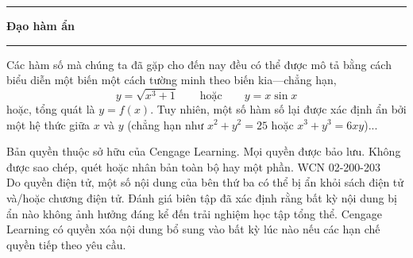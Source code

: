\noindent
\begin{minipage}[t]{0.19\textwidth}
    \vspace{0pt}
    \flushright
    \hspace{6pt}%
    {\color{stewartcyan}\rule[-4pt]{1.4pt}{24pt}}
\end{minipage}%
\hfill
\begin{minipage}[t]{0.78\textwidth}
    \vspace{0pt}
    {\bfseries\sffamily\fontsize{22pt}{24pt}\selectfont Đạo hàm ẩn}
    
    \vspace{0.25cm}
    \noindent
    {\color{stewartcyan}\rule{5pt}{5pt}}\hspace{5pt}{\bfseries\sffamily\normalsize Các hàm số xác định ẩn}
    
    \vspace{0.15cm}
    \noindent
    Các hàm số mà chúng ta đã gặp cho đến nay đều có thể được mô tả bằng cách biểu diễn một biến một cách tường minh theo biến kia---chẳng hạn,
    \[
    y = \sqrt{x^3 + 1} \qquad \text{hoặc} \qquad y = x \sin x
    \]
    hoặc, tổng quát là $y = f(x)$. Tuy nhiên, một số hàm số lại được xác định ẩn bởi một hệ thức giữa $x$ và $y$ (chẳng hạn như $x^2 + y^2 = 25$ hoặc $x^3 + y^3 = 6xy$)...
\end{minipage}

\vfill
\noindent
\begin{minipage}{\textwidth}
    \centering
    \fontsize{6.2pt}{7.5pt}\selectfont\color{copyrightgray}
    Bản quyền thuộc sở hữu của Cengage Learning. Mọi quyền được bảo lưu. Không được sao chép, quét hoặc nhân bản toàn bộ hay một phần. WCN 02-200-203\\ 
    Do quyền điện tử, một số nội dung của bên thứ ba có thể bị ẩn khỏi sách điện tử và/hoặc chương điện tử. Đánh giá biên tập đã xác định rằng bất kỳ nội dung bị ẩn nào không ảnh hưởng đáng kể đến trải nghiệm học tập tổng thể. Cengage Learning có quyền xóa nội dung bổ sung vào bất kỳ lúc nào nếu các hạn chế quyền tiếp theo yêu cầu.
\end{minipage}
